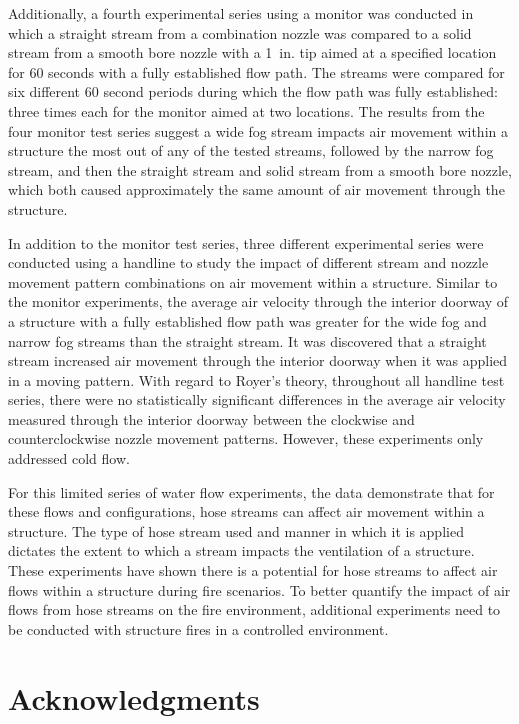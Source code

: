 \documentclass[12pt,oneside]{book}
\begin{document}
Additionally, a fourth experimental series using a monitor was conducted in which a straight stream from a combination nozzle was compared to a solid stream from a smooth bore nozzle with a 1~in. tip aimed at a specified location for 60 seconds with a fully established flow path. The streams were compared for six different 60 second periods during which the flow path was fully established: three times each for the monitor aimed at two locations. The results from the four monitor test series suggest a wide fog stream impacts air movement within a structure the most out of any of the tested streams, followed by the narrow fog stream, and then the straight stream and solid stream from a smooth bore nozzle, which both caused approximately the same amount of air movement through the structure.

In addition to the monitor test series, three different experimental series were conducted using a handline to study the impact of different stream and nozzle movement pattern combinations on air movement within a structure. Similar to the monitor experiments, the average air velocity through the interior doorway of a structure with a fully established flow path was greater for the wide fog and narrow fog streams than the straight stream. It was discovered that a straight stream increased air movement through the interior doorway when it was applied in a moving pattern. With regard to Royer's theory, throughout all handline test series, there were no statistically significant differences in the average air velocity measured through the interior doorway between the clockwise and counterclockwise nozzle movement patterns. However, these experiments only addressed cold flow.

For this limited series of water flow experiments, the data demonstrate that for these flows and configurations, hose streams can affect air movement within a structure. The type of hose stream used and manner in which it is applied dictates the extent to which a stream impacts the ventilation of a structure. These experiments have shown there is a potential for hose streams to affect air flows within a structure during fire scenarios. To better quantify the impact of air flows from hose streams on the fire environment, additional experiments need to be conducted with structure fires in a controlled environment.

\chapter{Acknowledgments}
\label{chap:acknowledgments}
\end{document}
